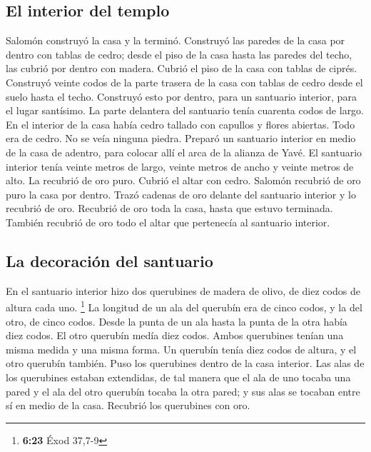 \begin{paracol}{2}
\hypertarget{el-interior-del-templo}{%
\subsection{El interior del templo}\label{el-interior-del-templo}}

 Salomón construyó la casa y la terminó. 
Construyó las paredes de la casa por dentro con tablas de cedro; desde
el piso de la casa hasta las paredes del techo, las cubrió por dentro
con madera. Cubrió el piso de la casa con tablas de ciprés.
 Construyó veinte codos de la parte trasera de la casa
con tablas de cedro desde el suelo hasta el techo. Construyó esto por
dentro, para un santuario interior, para el lugar santísimo.
 La parte delantera del santuario tenía cuarenta codos de
largo.  En el interior de la casa había cedro tallado con
capullos y flores abiertas. Todo era de cedro. No se veía ninguna
piedra.  Preparó un santuario interior en medio de la
casa de adentro, para colocar allí el arca de la alianza de Yavé.
 El santuario interior tenía veinte metros de largo,
veinte metros de ancho y veinte metros de alto. La recubrió de oro puro.
Cubrió el altar con cedro.  Salomón recubrió de oro puro
la casa por dentro. Trazó cadenas de oro delante del santuario interior
y lo recubrió de oro.  Recubrió de oro toda la casa,
hasta que estuvo terminada. También recubrió de oro todo el altar que
pertenecía al santuario interior.

\hypertarget{la-decoraciuxf3n-del-santuario}{%
\subsection{La decoración del
santuario}\label{la-decoraciuxf3n-del-santuario}}

 En el santuario interior hizo dos querubines de madera
de olivo, de diez codos de altura cada uno. \footnote{\textbf{6:23} Éxod
  37,7-9}  La longitud de un ala del querubín era de
cinco codos, y la del otro, de cinco codos. Desde la punta de un ala
hasta la punta de la otra había diez codos.  El otro
querubín medía diez codos. Ambos querubines tenían una misma medida y
una misma forma.  Un querubín tenía diez codos de altura,
y el otro querubín también.  Puso los querubines dentro
de la casa interior. Las alas de los querubines estaban extendidas, de
tal manera que el ala de uno tocaba una pared y el ala del otro querubín
tocaba la otra pared; y sus alas se tocaban entre sí en medio de la
casa.  Recubrió los querubines con oro.


\end{paracol}
